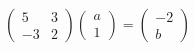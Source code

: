 $\begin{pmatrix} 5 & 3 \\ -3 & 2 \end{pmatrix}\begin{pmatrix} a \\ 1 \end{pmatrix}=\begin{pmatrix} -2 \\ b \end{pmatrix}$
